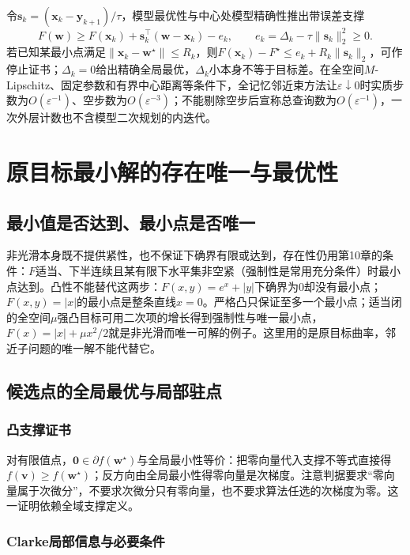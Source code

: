 令$\bm s_k=(\bm x_k-\bm y_{k+1})/\tau$，模型最优性与中心处模型精确性推出带误差支撑
\[
 F(\bm w)\geq F(\bm x_k)+\bm s_k^\top(\bm w-\bm x_k)-e_k,
 \qquad e_k=\Delta_k-\tau\|\bm s_k\|_2^2\geq0.
\]
若已知某最小点满足$\|\bm x_k-\bm w^\star\|\leq R_k$，则$F(\bm x_k)-F^\star\leq e_k+R_k\|\bm s_k\|_2$，可作停止证书；$\Delta_k=0$给出精确全局最优，$\Delta_k$小本身不等于目标差。在全空间$M$-Lipschitz、固定参数和有界中心距离等条件下，全记忆邻近束方法让$\varepsilon\downarrow0$时实质步数为$O(\varepsilon^{-1})$、空步数为$O(\varepsilon^{-3})$；不能剔除空步后宣称总查询数为$O(\varepsilon^{-1})$，一次外层计数也不含模型二次规划的内迭代。

\section{原目标最小解的存在唯一与最优性}

\subsection{最小值是否达到、最小点是否唯一}

非光滑本身既不提供紧性，也不保证下确界有限或达到，存在性仍用第10章的条件：$F$适当、下半连续且某有限下水平集非空紧（强制性是常用充分条件）时最小点达到。凸性不能替代这两步：$F(x,y)=e^x+|y|$下确界为$0$却没有最小点；$F(x,y)=|x|$的最小点是整条直线$x=0$。严格凸只保证至多一个最小点；适当闭的全空间$\mu$强凸目标可用二次项的增长得到强制性与唯一最小点，$F(x)=|x|+\mu x^2/2$就是非光滑而唯一可解的例子。这里用的是原目标曲率，邻近子问题的唯一解不能代替它。

\subsection{候选点的全局最优与局部驻点}

\subsubsection{凸支撑证书}

对有限值点，$\bm0\in\partial f(\bm w^\star)$与全局最小性等价：把零向量代入支撑不等式直接得$f(\bm v)\geq f(\bm w^\star)$；反方向由全局最小性得零向量是次梯度。注意判据要求“零向量属于次微分”，不要求次微分只有零向量，也不要求算法任选的次梯度为零。这一证明依赖全域支撑定义。

\subsubsection{Clarke局部信息与必要条件}

